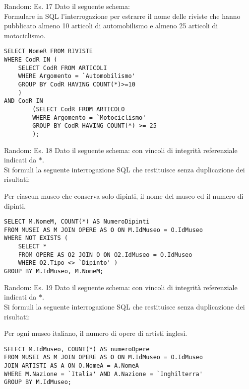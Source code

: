 %
\begin{frame}[fragile]{Random: Es. 17}
\vspace{-.5cm}
Dato il seguente schema:
\schemaRivisteArticoli
\\Formulare in SQL l'interrogazione per estrarre il nome delle riviste che hanno pubblicato almeno 10 articoli di automobilismo e almeno 25 articoli di motociclismo.
\pause

\begin{lstlisting}   
SELECT NomeR FROM RIVISTE
WHERE CodR IN (
    SELECT CodR FROM ARTICOLI
    WHERE Argomento = `Automobilismo'
    GROUP BY CodR HAVING COUNT(*)>=10
    ) 
AND CodR IN 
        (SELECT CodR FROM ARTICOLO
        WHERE Argomento = `Motociclismo'
        GROUP BY CodR HAVING COUNT(*) >= 25
        );   
\end{lstlisting}
\end{frame}
%
\begin{frame}[fragile]{Random: Es. 18}
\vspace{-.5cm}
Dato il seguente schema:
\schemaMuseiOpereArtisti
con vincoli di integrit\`a referenziale indicati da $*$.
\newline
\\Si formuli la seguente interrogazione SQL che restituisce senza duplicazione dei risultati:

Per ciascun museo che conserva solo dipinti, il nome del museo ed il numero di dipinti.
\pause

\begin{lstlisting}   
SELECT M.NomeM, COUNT(*) AS NumeroDipinti
FROM MUSEI AS M JOIN OPERE AS O ON M.IdMuseo = O.IdMuseo
WHERE NOT EXISTS (
    SELECT *
    FROM OPERE AS O2 JOIN O ON O2.IdMuseo = O.IdMuseo
    WHERE O2.Tipo <> `Dipinto' )
GROUP BY M.IdMuseo, M.NomeM;
\end{lstlisting}
\end{frame}
%
\begin{frame}[fragile]{Random: Es. 19}
\vspace{-.5cm}
Dato il seguente schema:
\schemaMuseiOpereArtisti
con vincoli di integrit\`a referenziale indicati da $*$.
\newline
\\Si formuli la seguente interrogazione SQL che restituisce senza duplicazione dei risultati:

Per ogni museo italiano, il numero di opere di artisti inglesi.
\pause

\begin{lstlisting}   
SELECT M.IdMuseo, COUNT(*) AS numeroOpere
FROM MUSEI AS M JOIN OPERE AS O ON M.IdMuseo = O.IdMuseo
JOIN ARTISTI AS A ON O.NomeA = A.NomeA
WHERE M.Nazione = `Italia' AND A.Nazione = `Inghilterra'
GROUP BY M.IdMuseo;
\end{lstlisting}
\end{frame}
